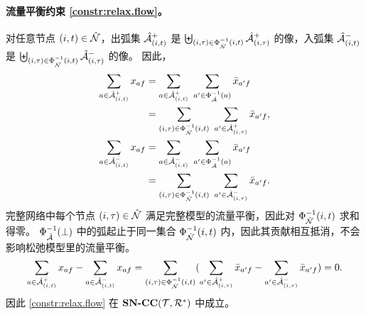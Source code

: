 \paragraph*{流量平衡约束 \eqref{constr:relax.flow}。}
对任意节点 $(i,t)\in\hat{\mathcal{N}}$，出弧集
${\hat{\mathcal{A}}^{+}_{(i,t)}}$ 是 $\biguplus_{(i,\tau)\in\Phi_{\hat{\mathcal{N}}}^{-1}(i,t)}{\hat{\mathcal{A}}^{+}_{(i,\tau)}}$ 的像，入弧集
${\hat{\mathcal{A}}^{-}_{(i,t)}}$ 是 $\biguplus_{(i,\tau)\in\Phi_{\hat{\mathcal{N}}}^{-1}(i,t)}{\hat{\mathcal{A}}^{-}_{(i,\tau)}}$ 的像。
因此，
\begin{equation*}
\begin{aligned}
    \sum_{a\in\outArcSet{(i,t)}}\fleetAssignVar_{af}
    &= \sum_{a\in\outArcSet{(i,t)}}\ \sum_{a'\in\Phi_{\arcSet}^{-1}(a)}\bar{\fleetAssignVar}_{a'f}\\
    &= \sum_{(i,\tau)\in\Phi_{\nodeSet}^{-1}(i,t)}\ \sum_{a'\in\outArcSet{(i,\tau)}}\bar{\fleetAssignVar}_{a'f},\\
    \sum_{a\in\inArcSet{(i,t)}}\fleetAssignVar_{af}
    &= \sum_{a\in\inArcSet{(i,t)}}\ \sum_{a'\in\Phi_{\arcSet}^{-1}(a)}\bar{\fleetAssignVar}_{a'f}\\
    &= \sum_{(i,\tau)\in\Phi_{\nodeSet}^{-1}(i,t)}\ \sum_{a'\in\inArcSet{(i,\tau)}}\bar{\fleetAssignVar}_{a'f}.
\end{aligned}
\end{equation*}
完整网络中每个节点 $(i,\tau)\in\full{\nodeSet}$ 满足完整模型的流量平衡，因此对 $\Phi_{\hat{\mathcal{N}}}^{-1}(i,t)$ 求和得零。
$\Phi_{\hat{\mathcal{A}}}^{-1}(\bot)$ 中的弧起止于同一集合 $\Phi_{\hat{\mathcal{N}}}^{-1}(i,t)$ 内，因此其贡献相互抵消，不会影响松弛模型里的流量平衡。
\[
\sum_{a\in{\hat{\mathcal{A}}^{+}_{(i,t)}}}x_{af} - \sum_{a\in{\hat{\mathcal{A}}^{-}_{(i,t)}}}x_{af} = \sum_{(i,\tau)\in\Phi_{\hat{\mathcal{N}}}^{-1}(i,t)} (\sum_{a'\in{\hat{\mathcal{A}}^{+}_{(i,\tau)}}}\bar{x}_{a'f} - \sum_{a'\in{\hat{\mathcal{A}}^{-}_{(i,\tau)}}}\bar{x}_{a'f}) = 0.
\]
因此 \eqref{constr:relax.flow} 在 $\textbf{SN-CC}({\mathcal{T}, \mathcal{R}^{*}})$ 中成立。